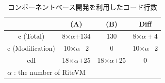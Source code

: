 \documentclass[submit,techrep]{ipsj}
\begin{document}
\begin{table}[t]
    \centering
    \caption{コンポーネントベース開発を利用したコード行数} 
    \begin{tabular}{c||cc|c}
                & (A)       & (B)     & Diff  \\ \hline
        c (Total)      & 8$\times$$\alpha$$+$134  & 130     & 8$\times$$\alpha+$4\\
        c (Modification)   & 10$\times\alpha$$-$2 & 0   &  10$\times\alpha$$-$2 \\
        cdl    & 18$\times$$\alpha$$+$25   & 18$\times$$\alpha$$+$25 & 0     \\
        \multicolumn{3}{l}{{\small $\alpha$} : {\scriptsize the number of RiteVM}}
    \end{tabular}
    \vspace{-2mm}
    \label{tab:codesize}
\end{table}

\vspace{-1mm}
\end{document}

